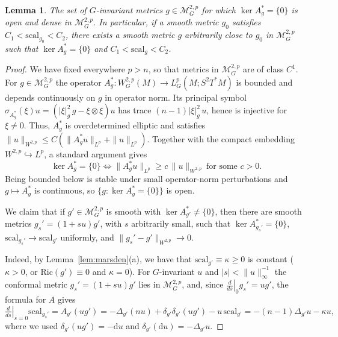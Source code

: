 \documentclass[12pt,a4paper]{amsart}
\theoremstyle{plain}
\newtheorem{lemma}[theorem]{Lemma}
\theoremstyle{definition}
\theoremstyle{remark}
\newcommand{\ga}{\mathit{g}} %
\begin{document}
\begin{lemma}\label{lem:dense_kernel}
The set of $G$-invariant metrics $\ga \in \mathcal{M}_G^{2,p}$ for which $\ker A_{\ga}^* = \{0\}$ is open and dense in $\mathcal{M}_G^{2,p}$. In particular, if a smooth metric $\ga_0$ satisfies $C_1 < \mathrm{scal}_{\ga_0} < C_2$, there exists a smooth metric $\ga$ arbitrarily close to $\ga_0$ in $\mathcal{M}_G^{2,p}$ such that $\ker A_{\ga}^* = \{0\}$ and $C_1 < \mathrm{scal}_{\ga} < C_2$.
\end{lemma}
\begin{proof}
We have fixed everywhere $p>n$, so that metrics in $\mathcal M_G^{2,p}$ are of class $C^1$. For $\ga\in\mathcal M_G^{2,p}$ the operator
$A_\ga^*\colon W_G^{2,p}(M)\to L_G^p(M;S^2T^*M)$ is bounded and depends continuously on $\ga$ in operator norm. Its principal symbol
$\sigma_{A_\ga^*}(\xi)u=(|\xi|_\ga^2\,\ga-\xi\otimes\xi)u$ has trace
$(n-1)|\xi|_\ga^2\,u$, hence is injective for $\xi\neq0$. Thus, $A_\ga^*$ is
overdetermined elliptic and satisfies
$\|u\|_{W^{2,p}}\le C(\|A_\ga^*u\|_{L^p}+\|u\|_{L^p})$. Together with the compact
embedding $W^{2,p}\hookrightarrow L^p$, a standard argument gives
\[
  \ker A_\ga^*=\{0\}\iff \|A_\ga^*u\|_{L^p}\ge c\,\|u\|_{W^{2,p}}\ \text{for some }c>0 .
\]
Being bounded below is stable under small operator-norm perturbations and
$\ga\mapsto A_\ga^*$ is continuous, so $\{\ga:\ker A_\ga^*=\{0\}\}$ is open.

We claim that if $\ga'\in\mathcal M_G^{2,p}$ is smooth with
$\ker A_{\ga'}^*\neq\{0\}$, then there are smooth metrics $\ga_s'=(1+su)\ga'$, with $s$ arbitrarily small, such that $\ker A_{\ga_s'}^*=\{0\}$,
$\mathrm{scal}_{\ga_s'}\to\mathrm{scal}_{\ga'}$ uniformly, and
$\|\ga_s'-\ga'\|_{W^{2,p}}\to0$.

Indeed, by Lemma~\ref{lem:marsden}(a), we have that $\mathrm{scal}_{\ga'}\equiv\kappa\ge0$ is constant
($\kappa>0$, or $\mathrm{Ric}(\ga')\equiv0$ and $\kappa=0$). For $G$-invariant
$u$ and $|s|<\|u\|_\infty^{-1}$ the conformal metric $\ga_s'=(1+su)\ga'$ lies in $\mathcal M_G^{2,p}$, and, since $\left.\tfrac{d}{ds}\right|_{0}\ga_s'=u\ga'$,
the formula for $A$ gives
\[
  \left.\tfrac{d}{ds}\right|_{s=0}\mathrm{scal}_{\ga_s'}
  =A_{\ga'}(u\ga')=-\Delta_{\ga'}(n u)+\delta_{\ga'}\delta_{\ga'}(u\ga')-u\,\mathrm{scal}_{\ga'}
  =-(n-1)\Delta_{\ga'}u-\kappa u ,
\]
where we used $\delta_{\ga'}(u\ga')=-\mathrm{d} u$ and $\delta_{\ga'}(\mathrm{d} u)=-\Delta_{\ga'}u$.


\end{proof}
\end{document}
